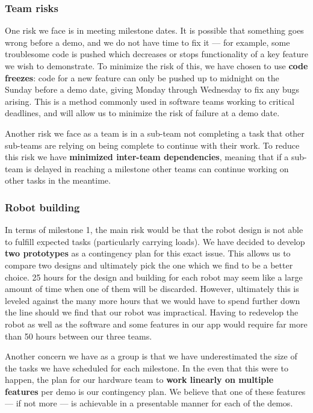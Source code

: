 \documentclass{article}
\begin{document}
\subsubsection{Team risks}

One risk we face is in meeting milestone dates. It is possible that something goes wrong before a demo, and we do not have time to fix it --- for example, some troublesome code is pushed which decreases or stops functionality of a key feature we wish to demonstrate. To minimize the risk of this, we have chosen to use {\bf code freezes}: code for a new feature can only be pushed up to midnight on the Sunday before a demo date, giving Monday through Wednesday to fix any bugs arising. This is a method commonly used in software teams working to critical deadlines, and will allow us to minimize the risk of failure at a demo date.

Another risk we face as a team is in a sub-team not completing a task that other sub-teams are relying on being complete to continue with their work. To reduce this risk we have {\bf minimized inter-team dependencies}, meaning that if a sub-team is delayed in reaching a milestone other teams can continue working on other tasks in the meantime. 

\subsubsection{Robot building}

In terms of milestone 1, the main risk would be that the robot design is not able to fulfill expected tasks (particularly carrying loads). We have decided to develop {\bf two prototypes} as a contingency plan for this exact issue. This allows us to compare two designs and ultimately pick the one which we find to be a better choice. 25 hours for the design and building for each robot may seem like a large amount of time when one of them will be discarded. However, ultimately this is leveled against the many more hours that we would have to spend further down the line should we find that our robot was impractical. Having to redevelop the robot as well as the software and some features in our app would require far more than 50 hours between our three teams.

Another concern we have as a group is that we have underestimated the size of the tasks we have scheduled for each milestone. In the even that this were to happen, the plan for our hardware team to {\bf work linearly on multiple features} per demo is our contingency plan. We believe that one of these features --- if not more --- is achievable in a presentable manner for each of the demos.
\end{document}

